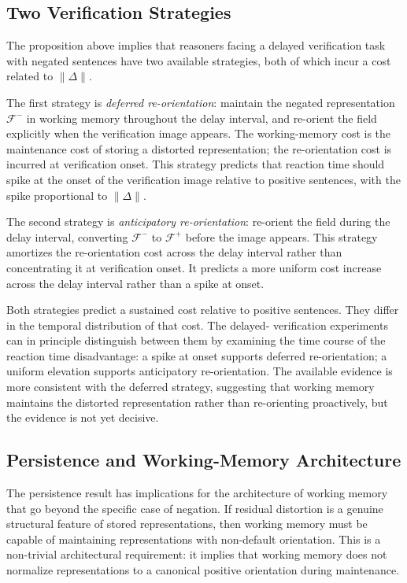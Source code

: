 \documentclass[12pt]{article}
\theoremstyle{remark}
\begin{document}
\subsection{Two Verification Strategies}

The proposition above implies that reasoners facing a delayed
verification task with negated sentences have two available strategies,
both of which incur a cost related to $\|\Delta\|$.

The first strategy is \emph{deferred re-orientation}: maintain the
negated representation $\mathcal{F}^-$ in working memory throughout the
delay interval, and re-orient the field explicitly when the verification
image appears. The working-memory cost is the maintenance cost of storing
a distorted representation; the re-orientation cost is incurred at
verification onset. This strategy predicts that reaction time should
spike at the onset of the verification image relative to positive
sentences, with the spike proportional to $\|\Delta\|$.

The second strategy is \emph{anticipatory re-orientation}: re-orient the
field during the delay interval, converting $\mathcal{F}^-$ to
$\mathcal{F}^+$ before the image appears. This strategy amortizes the
re-orientation cost across the delay interval rather than concentrating
it at verification onset. It predicts a more uniform cost increase across
the delay interval rather than a spike at onset.

Both strategies predict a sustained cost relative to positive sentences.
They differ in the temporal distribution of that cost. The delayed-
verification experiments can in principle distinguish between them by
examining the time course of the reaction time disadvantage: a spike at
onset supports deferred re-orientation; a uniform elevation supports
anticipatory re-orientation. The available evidence is more consistent
with the deferred strategy, suggesting that working memory maintains the
distorted representation rather than re-orienting proactively, but the
evidence is not yet decisive.

\subsection{Persistence and Working-Memory Architecture}

The persistence result has implications for the architecture of working
memory that go beyond the specific case of negation. If residual
distortion is a genuine structural feature of stored representations,
then working memory must be capable of maintaining representations with
non-default orientation. This is a non-trivial architectural requirement:
it implies that working memory does not normalize representations to a
canonical positive orientation during maintenance.
\end{document}
